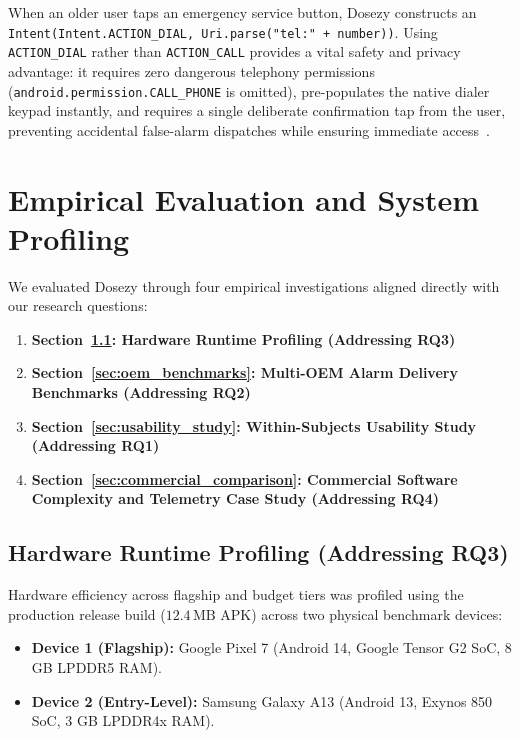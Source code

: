 \documentclass[11pt,a4paper]{article}
\begin{document}
When an older user taps an emergency service button, Dosezy constructs an \texttt{Intent(Intent.ACTION\_DIAL, Uri.parse("tel:" + number))}. Using \texttt{ACTION\_DIAL} rather than \texttt{ACTION\_CALL} provides a vital safety and privacy advantage: it requires zero dangerous telephony permissions (\texttt{android.permission.CALL\_PHONE} is omitted), pre-populates the native dialer keypad instantly, and requires a single deliberate confirmation tap from the user, preventing accidental false-alarm dispatches while ensuring immediate access~\cite{etsi2020emergency,itu2008emergency}.

\section{Empirical Evaluation and System Profiling}
\label{sec:evaluation}

We evaluated Dosezy through four empirical investigations aligned directly with our research questions:
\begin{enumerate}
    \item \textbf{Section~\ref{sec:runtime_profiling}: Hardware Runtime Profiling (Addressing RQ3)}
    \item \textbf{Section~\ref{sec:oem_benchmarks}: Multi-OEM Alarm Delivery Benchmarks (Addressing RQ2)}
    \item \textbf{Section~\ref{sec:usability_study}: Within-Subjects Usability Study (Addressing RQ1)}
    \item \textbf{Section~\ref{sec:commercial_comparison}: Commercial Software Complexity and Telemetry Case Study (Addressing RQ4)}
\end{enumerate}

\subsection{Hardware Runtime Profiling (Addressing RQ3)}
\label{sec:runtime_profiling}

Hardware efficiency across flagship and budget tiers was profiled using the production release build ($12.4\,\text{MB}$ APK) across two physical benchmark devices:
\begin{itemize}[leftmargin=*]
    \item \textbf{Device 1 (Flagship):} Google Pixel 7 (Android 14, Google Tensor G2 SoC, 8 GB LPDDR5 RAM).
    \item \textbf{Device 2 (Entry-Level):} Samsung Galaxy A13 (Android 13, Exynos 850 SoC, 3 GB LPDDR4x RAM).
\end{itemize}
\end{document}
